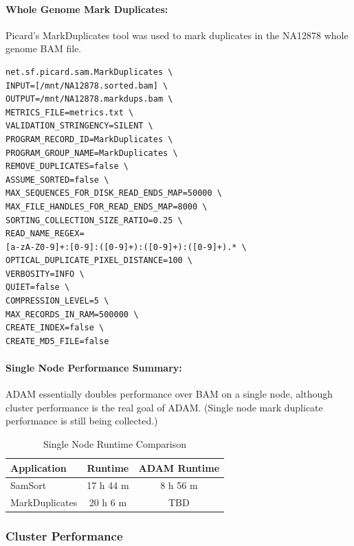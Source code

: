 \documentclass[10pt,twocolumn]{article}
\theoremstyle{plain}
\begin{document}
\paragraph{Whole Genome Mark Duplicates:}
\label{sec:single-node-whole-genome}

Picard's MarkDuplicates tool was used to mark duplicates in the NA12878 whole genome BAM file.

\begin{lstlisting}
net.sf.picard.sam.MarkDuplicates \
INPUT=[/mnt/NA12878.sorted.bam] \
OUTPUT=/mnt/NA12878.markdups.bam \
METRICS_FILE=metrics.txt \
VALIDATION_STRINGENCY=SILENT \
PROGRAM_RECORD_ID=MarkDuplicates \
PROGRAM_GROUP_NAME=MarkDuplicates \
REMOVE_DUPLICATES=false \
ASSUME_SORTED=false \
MAX_SEQUENCES_FOR_DISK_READ_ENDS_MAP=50000 \
MAX_FILE_HANDLES_FOR_READ_ENDS_MAP=8000 \
SORTING_COLLECTION_SIZE_RATIO=0.25 \
READ_NAME_REGEX=
[a-zA-Z0-9]+:[0-9]:([0-9]+):([0-9]+):([0-9]+).* \
OPTICAL_DUPLICATE_PIXEL_DISTANCE=100 \
VERBOSITY=INFO \
QUIET=false \
COMPRESSION_LEVEL=5 \
MAX_RECORDS_IN_RAM=500000 \
CREATE_INDEX=false \
CREATE_MD5_FILE=false
\end{lstlisting}

\paragraph{Single Node Performance Summary:}
\label{sec:single-node-summary}
ADAM essentially doubles performance over BAM on a single node, although cluster performance is the real goal of ADAM. (Single node mark duplicate performance is still being collected.)

\begin{table}[h]
\caption{Single Node Runtime Comparison}
\label{tab:single-node-performance}
\begin{center}
\begin{tabular}{| l | c | c |}
\hline
\bf Application & \bf Runtime & \bf ADAM Runtime \\
\hline
SamSort & 17 h 44 m & 8 h 56 m \\
MarkDuplicates & 20 h 6 m & TBD \\  
\hline
\end{tabular}
\end{center}
\end{table}

\subsubsection{Cluster Performance}
\end{document}
